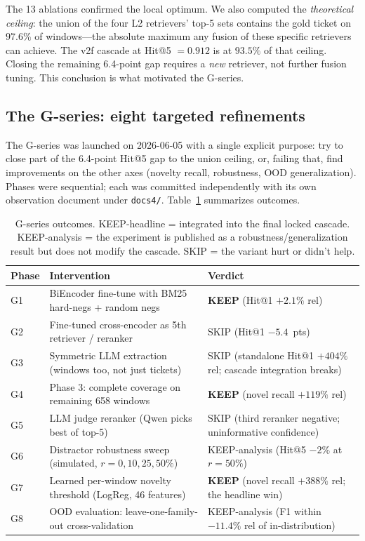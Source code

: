 The 13 ablations confirmed the local optimum. We also computed the \emph{theoretical ceiling}: the union of the four L2 retrievers' top-5 sets contains the gold ticket on $97.6\%$ of windows---the absolute maximum any fusion of these specific retrievers can achieve. The v2f cascade at Hit@5 $= 0.912$ is at $93.5\%$ of that ceiling. Closing the remaining 6.4-point gap requires a \emph{new} retriever, not further fusion tuning. This conclusion is what motivated the G-series.

\subsection{The G-series: eight targeted refinements}

The G-series was launched on 2026-06-05 with a single explicit purpose: try to close part of the 6.4-point Hit@5 gap to the union ceiling, or, failing that, find improvements on the other axes (novelty recall, robustness, OOD generalization). Phases were sequential; each was committed independently with its own observation document under \texttt{docs4/}. Table~\ref{tab:g-summary} summarizes outcomes.

\begin{table}[h]
\centering
\caption{G-series outcomes. KEEP-headline = integrated into the final locked cascade. KEEP-analysis = the experiment is published as a robustness/generalization result but does not modify the cascade. SKIP = the variant hurt or didn't help.}
\label{tab:g-summary}
\small
\setlength{\tabcolsep}{4pt}
\renewcommand{\arraystretch}{1.15}
\begin{tabularx}{\linewidth}{@{}l >{\raggedright\arraybackslash}X >{\raggedright\arraybackslash}X@{}}
\toprule
Phase & Intervention & Verdict \\
\midrule
G1 & BiEncoder fine-tune with BM25 hard-negs + random negs & \textbf{KEEP} (Hit@1 $+2.1\%$ rel) \\
G2 & Fine-tuned cross-encoder as 5th retriever / reranker & SKIP (Hit@1 $-5.4$~pts) \\
G3 & Symmetric LLM extraction (windows too, not just tickets) & SKIP (standalone Hit@1 $+404\%$ rel; cascade integration breaks) \\
G4 & \agent{} Phase 3: complete coverage on remaining 658 windows & \textbf{KEEP} (novel recall $+119\%$ rel) \\
G5 & LLM judge reranker (Qwen picks best of top-5) & SKIP (third reranker negative; uninformative confidence) \\
G6 & Distractor robustness sweep (simulated, $r = 0, 10, 25, 50\%$) & KEEP-analysis (Hit@5 $-2\%$ at $r=50\%$) \\
G7 & Learned per-window novelty threshold (LogReg, 46 features) & \textbf{KEEP} (novel recall $+388\%$ rel; the headline win) \\
G8 & OOD evaluation: leave-one-family-out cross-validation & KEEP-analysis (F1 within $-11.4\%$ rel of in-distribution) \\
\bottomrule
\end{tabularx}
\end{table}

